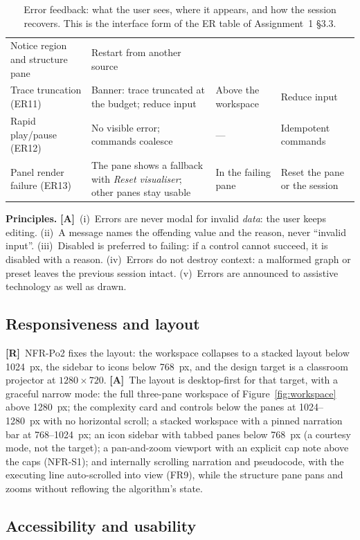\documentclass[11pt,a4paper]{article}
\newcommand{\R}{\textcolor{reqc}{\textbf{[R]}}}     %
\newcommand{\A}{\textcolor{asmc}{\textbf{[A]}}}     %
\begin{document}
\begin{table}[H]
\begin{tabular}{@{}L{2.4cm}L{4.0cm}L{3.4cm}L{3.5cm}@{}}
Notice region and structure pane & Restart from another source \\
Trace truncation (ER11) & Banner: trace truncated at the budget; reduce input & Above the
workspace & Reduce input \\
Rapid play/pause (ER12) & No visible error; commands coalesce & --- & Idempotent commands \\
Panel render failure (ER13) & The pane shows a fallback with \emph{Reset visualiser}; other
panes stay usable & In the failing pane & Reset the pane or the session \\
\bottomrule
\end{tabular}
\caption{Error feedback: what the user sees, where it appears, and how the session recovers.
This is the interface form of the ER table of Assignment~1 \S3.3.}
\label{tab:feedback}
\end{table}

\noindent\textbf{Principles.} \A\ (i)~Errors are never modal for invalid \emph{data}: the user
keeps editing. (ii)~A message names the offending value and the reason, never ``invalid
input''. (iii)~Disabled is preferred to failing: if a control cannot succeed, it is disabled
with a reason. (iv)~Errors do not destroy context: a malformed graph or preset leaves the
previous session intact. (v)~Errors are announced to assistive technology as well as drawn.

\subsection{Responsiveness and layout}

\R\ NFR-Po2 fixes the layout: the workspace collapses to a stacked layout below 1024~px, the
sidebar to icons below 768~px, and the design target is a classroom projector at
$1280\times720$. \A\ The layout is desktop-first for that target, with a graceful narrow mode:
the full three-pane workspace of Figure~\ref{fig:workspace} above 1280~px; the complexity card
and controls below the panes at 1024--1280~px with no horizontal scroll; a stacked workspace
with a pinned narration bar at 768--1024~px; an icon sidebar with tabbed panes below 768~px (a
courtesy mode, not the target); a pan-and-zoom viewport with an explicit cap note above the
caps (NFR-S1); and internally scrolling narration and pseudocode, with the executing line
auto-scrolled into view (FR9), while the structure pane pans and zooms without reflowing the
algorithm's state.

\subsection{Accessibility and usability}
\end{document}
